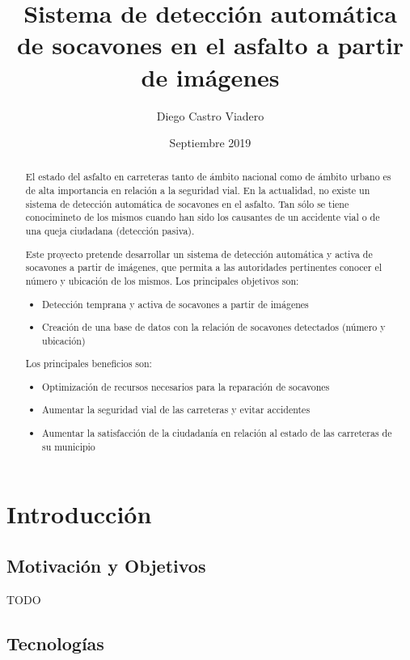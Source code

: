 \documentclass[]{article}
\title{Sistema de detección automática de socavones en el asfalto a partir de imágenes}
\author{Diego Castro Viadero}
\date{Septiembre 2019}
\begin{document}
\maketitle

\begin{abstract}
El estado del asfalto en carreteras tanto de ámbito nacional como de ámbito urbano es de alta importancia en relación a la seguridad vial. En la actualidad, no existe un sistema de detección automática de socavones en el asfalto. Tan sólo se tiene conocimineto de los mismos cuando han sido los causantes de un accidente vial o de una queja ciudadana (detección pasiva).

Este proyecto pretende desarrollar un sistema de detección automática y activa de socavones a partir de imágenes, que permita a las autoridades pertinentes conocer el número y ubicación de los mismos. Los principales objetivos son:

\begin{itemize}
	\item Detección temprana y activa de socavones a partir de imágenes
	\item Creación de una base de datos con la relación de socavones detectados (número y ubicación)
\end{itemize}

Los principales beneficios son:

\begin{itemize}
	\item Optimización de recursos necesarios para la reparación de socavones
	\item Aumentar la seguridad vial de las carreteras y evitar accidentes
	\item Aumentar la satisfacción de la ciudadanía en relación al estado de las carreteras de su municipio
\end{itemize}
\end{abstract}

\newpage
{}
\newpage

\section{Introducción}

\subsection{Motivación y Objetivos}

TODO

\subsection{Tecnologías}
\end{document}
